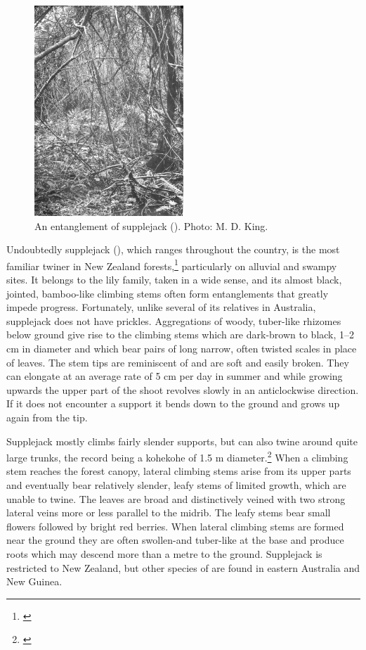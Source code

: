 \begin{figure}
	\includegraphics[width=0.5\textwidth]{graphics/figure33supplejack.jpg}
	\centering
	\caption[An entanglement of supplejack]{An entanglement of supplejack (). Photo:  M. D. King.}%
	\label{fig:33supplejack}
\end{figure}

Undoubtedly supplejack (), which ranges throughout the country, is the most familiar twiner in New Zealand forests,\footnote{\cite{macmillan1973biological}} particularly on alluvial and swampy sites.
It belongs to the lily family, taken in a wide sense, and its almost black, jointed, bamboo-like climbing stems often form entanglements that greatly impede progress.
Fortunately, unlike several of its relatives in Australia, supplejack does not have prickles.
Aggregations of woody, tuber-like rhizomes below ground give rise to the climbing stems which are dark-brown to black, 1--2 cm in diameter and which bear pairs of long narrow, often twisted scales in place of leaves.
The stem tips are reminiscent of  and are soft and easily broken.
They can elongate at an average rate of 5 cm per day in summer and while growing upwards the upper part of the shoot revolves slowly in an anticlockwise direction.
If it does not encounter a support it bends down to the ground and grows up again from the tip.

Supplejack mostly climbs fairly slender supports, but can also twine around quite large trunks, the record being a kohekohe of 1.5 m diameter.\footnote{\cite{macmillan1973biological}}
When a climbing stem reaches the forest canopy, lateral climbing stems arise from its upper parts and eventually bear relatively slender, leafy stems of limited growth, which are unable to twine.
The leaves are broad and distinctively veined with two strong lateral veins more or less parallel to the midrib.
The leafy stems bear small flowers followed by bright red berries.
When lateral climbing stems are formed near the ground they are often swollen-and tuber-like at the base and produce roots which may descend more than a metre to the ground.
Supplejack is restricted to New Zealand, but other species of  are found in eastern Australia and New Guinea.

